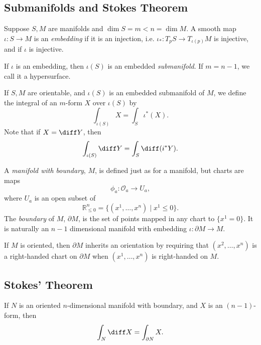 \documentclass[12pt]{article}
\begin{document}
\subsection{Submanifolds and Stokes Theorem}%
\label{sub:subs}

\begin{definition}
	Suppose $S, M$ are manifolds and $\dim S = m < n = \dim M$. A smooth map $\iota : S \to M$ is an \emph{embedding} if it is an injection, i.e. $\iota_\ast : T_p S \to T_{\iota(p)}M$ is injective, and if $\iota$ is injective.

	If $\iota$ is an embedding, then $\iota(S)$ is an embedded \emph{submanifold}. If $m = n - 1$, we call it a hypersurface.

	If $S, M$ are orientable, and $\iota(S)$ is an embedded submanifold of $M$, we define the integral of an $m$-form $X$ over $\iota(S)$ by
	\[
	\int_{\iota(S)} X = \int_S \iota^{\ast}(X).
	\]
	Note that if $X = \diff Y$, then
	\[
	\int_{\iota(S)} \diff Y = \int_S \diff (i^{\ast} Y).
	\]
\end{definition}


\begin{definition}
	A \emph{manifold with boundary}, $M$, is defined just as for a manifold, but charts are maps
	\[
	\phi_a : \mathcal{O}_a \to U_a,
	\]
	where $U_a$ is an open subset of
	\[
		\mathbb{R}^n_{\leq 0} = \{(x^1, \ldots, x^n) \mid x^1 \leq 0\}.
	\]
	The \emph{boundary} of $M$, $\partial M$, is the set of points mapped in any chart to $\{x^1 = 0\}$. It is naturally an $n-1$ dimensional manifold with embedding $\iota : \partial M \to M$.

	If $M$ is oriented, then $\partial M$ inherits an orientation by requiring that $(x^2, \ldots, x^n)$ is a right-handed chart on $\partial M$ when $(x^1, \ldots, x^n)$ is right-handed on $M$.
\end{definition}

\subsection{Stokes' Theorem}%
\label{sub:stm}

\begin{theorem}
	If $N$ is an oriented $n$-dimensional manifold with boundary, and $X$ is an $(n-1)$-form, then
	\[
	\int_N \diff X = \int_{\partial N} X.
	\]
\end{theorem}
\end{document}
